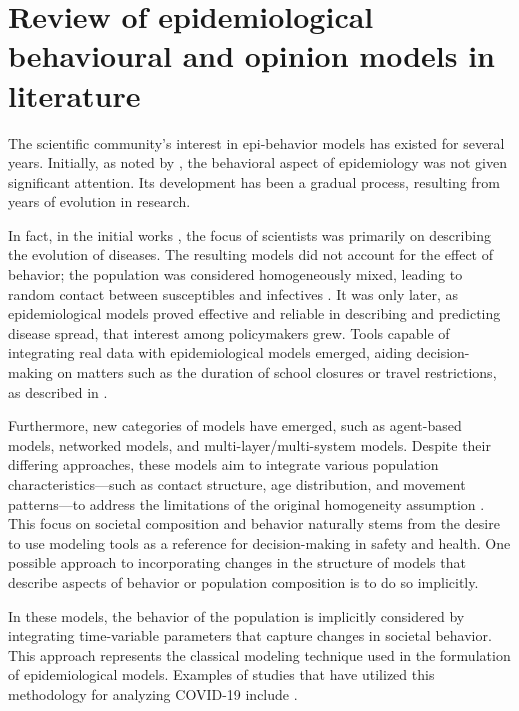  
\chapter{Review of epidemiological behavioural and opinion models in literature}
The scientific community's interest in epi-behavior models has existed for several years. Initially, as noted by \cite{Bauch_2012_overview}, the behavioral aspect of epidemiology was not given significant attention. Its development has been a gradual process, resulting from years of evolution in research.

In fact, in the initial works \cite{kermack1927}, the focus of scientists was primarily on describing the evolution of diseases. The resulting models did not account for the effect of behavior; the population was considered homogeneously mixed, leading to random contact between susceptibles and infectives \cite{Hernandez_Vargas_2022, Mata2021}. 
It was only later, as epidemiological models proved effective and reliable in describing and predicting disease spread, that interest among policymakers grew. Tools capable of integrating real data with epidemiological models emerged, aiding decision-making on matters such as the duration of school closures or travel restrictions, as described in \cite{Bauch_2012_overview}.

Furthermore, new categories of models have emerged, such as agent-based models, networked models, and multi-layer/multi-system models. Despite their differing approaches, these models aim to integrate various population characteristics—such as contact structure, age distribution, and movement patterns—to address the limitations of the original homogeneity assumption \cite{brauer2012mathematical}.
This focus on societal composition and behavior naturally stems from the desire to use modeling tools as a reference for decision-making in safety and health. 
One possible approach to incorporating changes in the structure of models that describe aspects of behavior or population composition is to do so implicitly.

In these models, the behavior of the population is implicitly considered by integrating time-variable parameters that capture changes in societal behavior. This approach represents the classical modeling technique used in the formulation of epidemiological models. Examples of studies that have utilized this methodology for analyzing COVID-19 include \cite{Giordano_2020, Dehning_2020, Proverbio_2021}.

